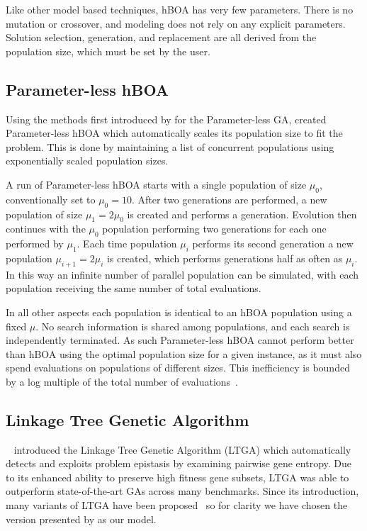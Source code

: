 \documentclass[twoside]{article}
\begin{document}
Like other model based techniques, hBOA has very few parameters. There is no mutation or crossover,
and modeling does not rely on any explicit parameters. Solution selection, generation, and replacement
are all derived from the population size, which must be set by the user.

\subsection{Parameter-less hBOA}
Using the methods first introduced by \cite{harik:1999:parameterlessga} for the Parameter-less GA,
\cite{pelikan:2004:parameterlesshboa} created Parameter-less hBOA which automatically scales its
population size to fit the problem. This is done by maintaining a list of concurrent populations
using exponentially scaled population sizes.

A run of Parameter-less hBOA starts with a single population of size $\mu_0$, conventionally set
to $\mu_0=10$. After two generations are performed, a new population of size $\mu_1 = 2\mu_0$ is created
and performs a generation. Evolution then continues with the $\mu_0$ population performing two generations
for each one performed by $\mu_1$. Each time population $\mu_i$ performs its second generation a new population
$\mu_{i+1}=2\mu_i$ is created, which performs generations half as often as $\mu_i$. In this way an infinite number of
parallel population can be simulated, with each population receiving the same number of total evaluations.

In all other aspects each population is identical to an hBOA population using a fixed $\mu$. No search information
is shared among populations, and each search is independently terminated. As such Parameter-less hBOA cannot
perform better than hBOA using the optimal population size for a given instance, as it must also spend evaluations
on populations of different sizes. This inefficiency is bounded by a log multiple of the total number of
evaluations~\citep{pelikan:1999:worstparameter-less}.

\subsection{Linkage Tree Genetic Algorithm}
~\cite{thierens:2010:ltga} introduced the Linkage Tree Genetic Algorithm (LTGA) which automatically
detects and exploits problem epistasis by examining pairwise gene entropy. Due to its enhanced
ability to preserve high fitness gene subsets, LTGA was able to outperform state-of-the-art
GAs across many benchmarks. Since its introduction, many variants of LTGA have been
proposed~\citep{goldman:2012:ltga} so for clarity we have chosen the version
presented by \cite{thierens:2013:ltgahiff} as our model.
\end{document}
